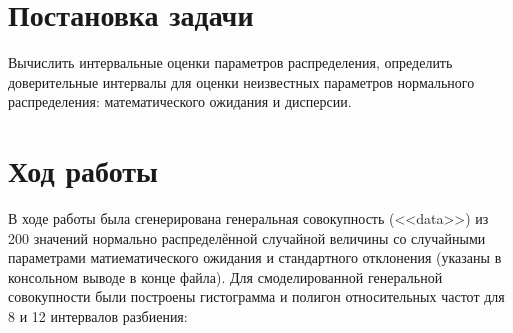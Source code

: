 \section{Постановка задачи}

Вычислить интервальные оценки параметров распределения, определить доверительные интервалы для оценки неизвестных параметров нормального распределения: математического ожидания и дисперсии.

\section{Ход работы}

В ходе работы была сгенерирована генеральная совокупность (<<data>>) из 200 значений нормально распределённой случайной величины со случайными параметрами матиематического ожидания и стандартного отклонения (указаны в консольном выводе в конце файла). Для смоделированной генеральной совокупности были построены гистограмма и полигон относительных частот для 8 и 12 интервалов разбиения:

